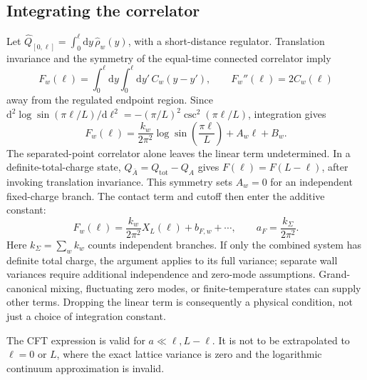 \documentclass[aps,prb,onecolumn,nofootinbib,superscriptaddress]{revtex4-2}
\newcommand{\dd}{\mathrm{d}}
\begin{document}
\subsection{Integrating the correlator}
Let $\hat Q_{[0,\ell]}=\int_0^\ell\dd y\,\hat\rho_w(y)$, with a
short-distance regulator. Translation invariance and the symmetry of the
equal-time connected correlator imply
\begin{equation}
 F_w(\ell)=\int_0^\ell\dd y\int_0^\ell\dd y'\,C_w(y-y'),\qquad
 F_w''(\ell)=2C_w(\ell)
 \label{eq:variance-derivatives}
\end{equation}
away from the regulated endpoint region. Since
$\dd^2\log\sin(\pi\ell/L)/\dd\ell^2
=-(\pi/L)^2\csc^2(\pi\ell/L)$, integration gives
\begin{equation}
 F_w(\ell)=\frac{k_w}{2\pi^2}
       \log\sin\left(\frac{\pi\ell}{L}\right)+A_w\ell+B_w.
 \label{eq:integrated-current}
\end{equation}
The separated-point correlator alone leaves the linear term undetermined.
In a definite-total-charge state, $Q_{\bar A}=Q_{\mathrm{tot}}-Q_A$ gives
$F(\ell)=F(L-\ell)$, after invoking translation invariance. This symmetry
sets $A_w=0$ for an independent fixed-charge branch. The contact term and
cutoff then enter the additive constant:
\begin{equation}
 F_w(\ell)=\frac{k_w}{2\pi^2}X_L(\ell)+b_{F,w}+\cdots,\qquad
 a_F=\frac{k_\Sigma}{2\pi^2}.
 \label{eq:charge-slope}
\end{equation}
Here $k_\Sigma=\sum_w k_w$ counts independent branches. If only the
combined system has definite total charge, the argument applies to its
full variance; separate wall variances require additional independence
and zero-mode assumptions. Grand-canonical mixing, fluctuating zero modes,
or finite-temperature states can supply other terms. Dropping the linear
term is consequently a physical condition, not just a choice of integration
constant.

The CFT expression is valid for $a\ll\ell,L-\ell$. It is not to be
extrapolated to $\ell=0$ or $L$, where the exact lattice variance is zero
and the logarithmic continuum approximation is invalid.
\end{document}
